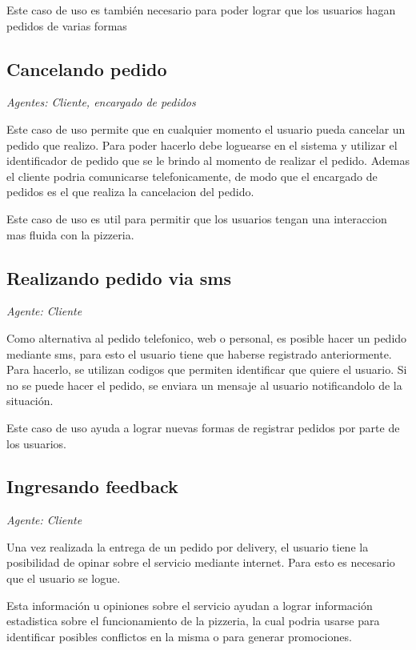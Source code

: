 Este caso de uso es también necesario para poder lograr que los usuarios hagan pedidos de 
varias formas

\subsection{Cancelando pedido} %

\textit{Agentes: Cliente, encargado de pedidos}

Este caso de uso permite que en cualquier momento el usuario pueda cancelar un pedido que 
realizo. Para poder hacerlo debe loguearse en el sistema y utilizar el identificador de 
pedido que se le brindo al momento de realizar el pedido. Ademas el cliente podria 
comunicarse telefonicamente, de modo que el encargado de pedidos es el que realiza la 
cancelacion del pedido.

Este caso de uso es util para permitir que los usuarios tengan una interaccion mas fluida 
con la pizzeria.

\subsection{Realizando pedido via sms}

\textit{Agente: Cliente}

Como alternativa al pedido telefonico, web o personal, es posible hacer un pedido mediante 
sms, para esto el usuario tiene que haberse registrado anteriormente. Para hacerlo, se utilizan codigos que permiten identificar que quiere el usuario. Si no se puede hacer el pedido, se enviara un mensaje al usuario notificandolo de la situación.

Este caso de uso ayuda a lograr nuevas formas de registrar pedidos por parte de los usuarios.

\subsection{Ingresando feedback}
\textit{Agente: Cliente}

Una vez realizada la entrega de un pedido por delivery, el usuario tiene la posibilidad de 
opinar sobre el servicio mediante internet. Para esto es necesario que el usuario se logue.

Esta información u opiniones sobre el servicio ayudan a lograr información estadistica sobre 
el funcionamiento de la pizzeria, la cual podria usarse para identificar posibles conflictos 
en la misma o para generar promociones.

